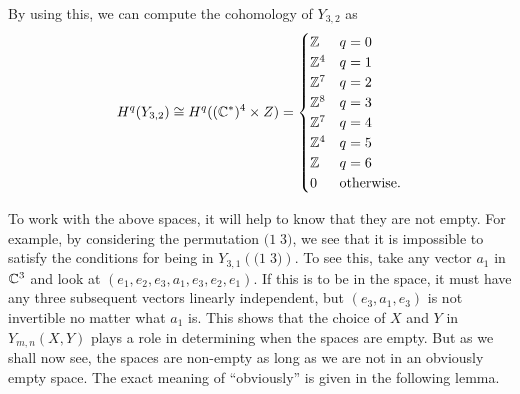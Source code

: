 \begin{example}
  By using this, we can compute the cohomology of $Y_{3,2}$ as
  \[ H^q(Y_{3,2}) \cong H^q((\mathbb{C}^*)^4\times Z) = 
  \begin{cases}
    \mathbb{Z} & q = 0 \\
    \mathbb{Z}^4 & q = 1 \\
    \mathbb{Z}^7 & q = 2 \\
    \mathbb{Z}^8 & q = 3 \\
    \mathbb{Z}^7 & q = 4 \\
    \mathbb{Z}^4 & q = 5 \\
    \mathbb{Z} & q = 6 \\
    0 & \text{otherwise}.
  \end{cases} \]
\end{example}



To work with the above spaces, it will help to know that they are not
empty. For example, by considering the permutation $\big(1\; 3\big)$,
we see that it is impossible to satisfy the 
conditions for being in $Y_{3,1}\left(\big(1\; 3\big)\right)$. To see
this, take any vector $a_1$ in $\mathbb{C}^3$ and look at
$(e_1,e_2,e_3,a_1,e_3,e_2,e_1)$. If this is to be in the space, it
must have any three subsequent vectors linearly independent, but
$(e_3,a_1,e_3)$ is not invertible no matter what $a_1$ is. This shows
that the choice of $X$ and $Y$ in $Y_{m,n}(X,Y)$ plays a role in
determining when the spaces are empty. But as we shall now see, the
spaces are non-empty as long as we are not in an obviously empty
space. The exact meaning of ``obviously'' is given in the following
lemma.

